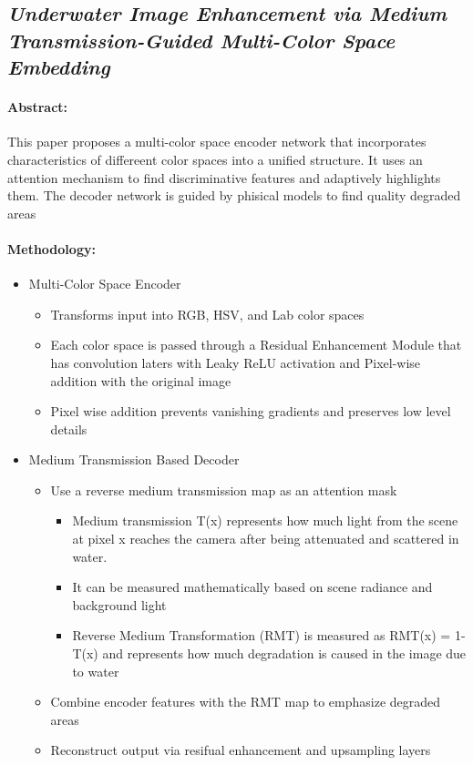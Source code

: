 \subsection{\textit{Underwater Image Enhancement via Medium
        Transmission-Guided Multi-Color Space Embedding\cite{Li_2021}}}

\paragraph{Abstract:}
This paper proposes a multi-color space encoder network that incorporates characteristics of differeent color spaces into a unified structure. It uses an attention mechanism to find discriminative features and adaptively highlights them. The decoder network is guided by phisical models to find quality degraded areas

\paragraph{Methodology:}
\begin{itemize}
    \item Multi-Color Space Encoder
          \begin{itemize}
              \item Transforms input into RGB, HSV, and Lab color spaces
              \item Each color space is passed through a Residual Enhancement Module that has convolution laters with Leaky ReLU activation and Pixel-wise addition with the original image
              \item Pixel wise addition prevents vanishing gradients and preserves low level details
          \end{itemize}

    \item Medium Transmission Based Decoder
          \begin{itemize}
              \item Use a reverse medium transmission map as an attention mask
                    \begin{itemize}
                        \item Medium transmission T(x) represents how much light from the scene at pixel x reaches the camera after being attenuated and scattered in water.
                        \item It can be measured mathematically based on scene radiance and background light
                        \item Reverse Medium Transformation (RMT) is measured as RMT(x) = 1-T(x) and represents how much degradation is caused in the image due to water
                    \end{itemize}
              \item Combine encoder features with the RMT map to emphasize degraded areas
              \item Reconstruct output via resifual enhancement and upsampling layers
          \end{itemize}
\end{itemize}

